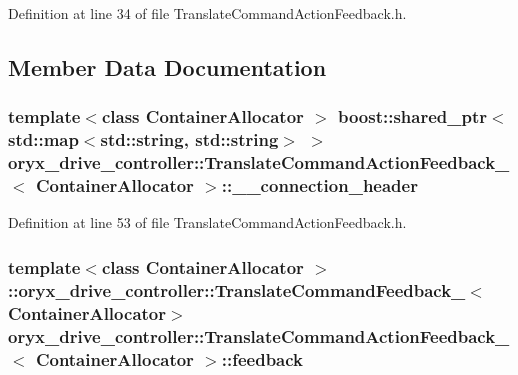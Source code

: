\-Definition at line 34 of file \-Translate\-Command\-Action\-Feedback.\-h.



\subsection{\-Member \-Data \-Documentation}
\subsubsection[{\-\_\-\-\_\-connection\-\_\-header}]{\setlength{\rightskip}{0pt plus 5cm}template$<$class Container\-Allocator $>$ boost\-::shared\-\_\-ptr$<$std\-::map$<$std\-::string, std\-::string$>$ $>$ {\bf oryx\-\_\-drive\-\_\-controller\-::\-Translate\-Command\-Action\-Feedback\-\_\-}$<$ \-Container\-Allocator $>$\-::{\bf \-\_\-\-\_\-connection\-\_\-header}}\label{structoryx__drive__controller_1_1TranslateCommandActionFeedback___af4183b3dae9cd413b80dfee9337160fb}


\-Definition at line 53 of file \-Translate\-Command\-Action\-Feedback.\-h.

\subsubsection[{feedback}]{\setlength{\rightskip}{0pt plus 5cm}template$<$class Container\-Allocator $>$ \-::{\bf oryx\-\_\-drive\-\_\-controller\-::\-Translate\-Command\-Feedback\-\_\-}$<$\-Container\-Allocator$>$ {\bf oryx\-\_\-drive\-\_\-controller\-::\-Translate\-Command\-Action\-Feedback\-\_\-}$<$ \-Container\-Allocator $>$\-::{\bf feedback}}\label{structoryx__drive__controller_1_1TranslateCommandActionFeedback___acb66391c62311829035d6cfa022438fa}


